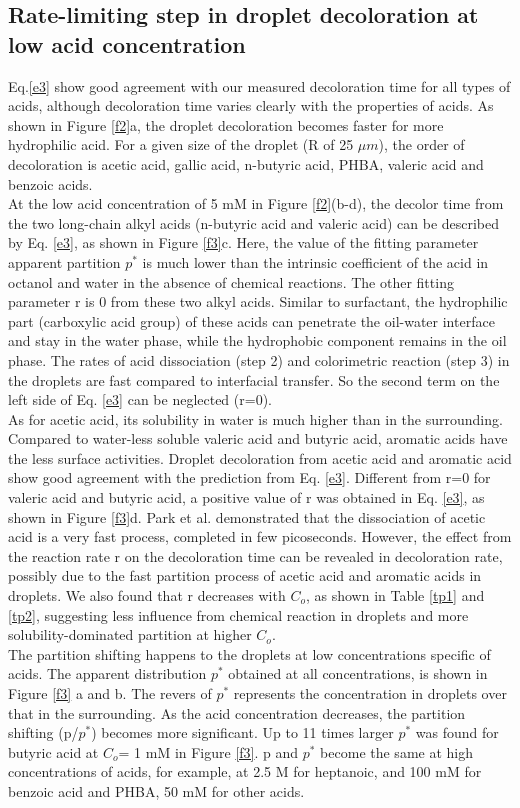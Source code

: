 \documentclass[journal=langd5,manuscript=article]{achemso}
\begin{document}
\subsection{Rate-limiting step in droplet decoloration at low acid concentration}
Eq.\ref{e3} show good agreement with our measured decoloration time for all types of acids, although decoloration time varies clearly with the properties of acids. As shown in Figure \ref{f2}a, the droplet decoloration becomes faster for more hydrophilic acid. For a given size of the droplet (R of 25 $\mu m$), the order of decoloration is acetic acid, gallic acid, n-butyric acid, PHBA, valeric acid and benzoic acids.\\
At the low acid concentration of 5 mM in Figure \ref{f2}(b-d), the decolor time from the two long-chain alkyl acids (n-butyric acid and valeric acid) can be described by Eq. \ref{e3}, as shown in Figure \ref{f3}c. Here, the value of the fitting parameter apparent partition $p^*$ is much lower than the intrinsic coefficient of the acid in octanol and water in the absence of chemical reactions. The other fitting parameter r is 0 from these two alkyl acids. Similar to surfactant, the hydrophilic part (carboxylic acid group) of these acids can penetrate the oil-water interface and stay in the water phase, while the hydrophobic component remains in the oil phase. The rates of acid dissociation (step 2) and colorimetric reaction (step 3) in the droplets are fast compared to interfacial transfer. So the second term on the left side of Eq. \ref{e3} can be neglected (r=0).\\
As for acetic acid, its solubility in water is much higher than in the surrounding. Compared to water-less soluble valeric acid and butyric acid, aromatic acids have the less surface activities. Droplet decoloration from acetic acid and aromatic acid show good agreement with the prediction from Eq. \ref{e3}. Different from r=0 for valeric acid and butyric acid, a positive value of r was obtained in Eq. \ref{e3}, as shown in Figure \ref{f3}d. Park et al. demonstrated that the dissociation of acetic acid is a very fast process, completed in few picoseconds.\cite{park2006dissociation} However, the effect from the reaction rate r on the decoloration time can be revealed in decoloration rate, possibly due to the fast partition process of acetic acid and aromatic acids in droplets. We also found that r decreases with $C_o$, as shown in Table \ref{tp1} and \ref{tp2}, suggesting less influence from chemical reaction in droplets and more solubility-dominated partition at higher $C_o$.\\
The partition shifting happens to the droplets at low concentrations specific of acids. The apparent distribution $p^*$ obtained at all concentrations, is shown in Figure \ref{f3} a and b. The revers of $p^*$ represents the concentration in droplets over that in the surrounding. As the acid concentration decreases, the partition shifting (p/$p^*$) becomes more significant. Up to 11 times larger $p^*$ was found for butyric acid at $C_o$= 1 mM in Figure \ref{f3}. p and $p^*$ become the same at high concentrations of acids, for example, at 2.5 M for heptanoic, and 100 mM for benzoic acid and PHBA, 50 mM for other acids. 
\end{document}
